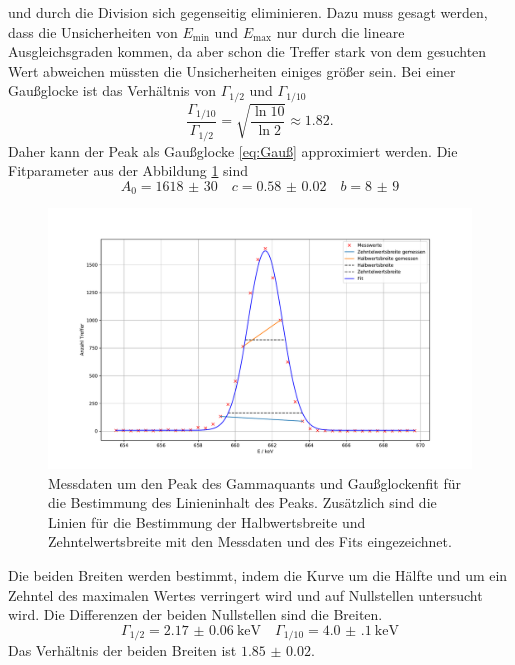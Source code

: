 und durch die Division sich gegenseitig eliminieren. Dazu muss gesagt werden, dass die Unsicherheiten von $E_{\text{min}}$ und
$E_{\text{max}}$ nur durch die lineare Ausgleichsgraden kommen, da aber schon die Treffer stark von dem gesuchten Wert abweichen müssten die 
Unsicherheiten einiges größer sein.
Bei einer Gaußglocke ist das Verhältnis von $\Gamma_{1/2}$ und $\Gamma_{1/10}$ 
\begin{equation*}
  \frac{\Gamma_{1/10}}{\Gamma_{1/2}}= \sqrt{\frac{\ln{10}}{\ln{2}}} \approx \num{1.82}.
\end{equation*}
Daher kann der Peak als Gaußglocke \eqref{eq:Gauß} approximiert werden. 
Die Fitparameter aus der Abbildung \ref{fig:02_fit} sind 
\begin{equation*}
  A_0 = \num{1618(30)}\quad c = \num{0.58(2)} \quad b = \num{8(9)}
\end{equation*}
\FloatBarrier
\begin{figure}
  \centering
  \caption{Messdaten um den Peak des Gammaquants und Gaußglockenfit für die Bestimmung des Linieninhalt des Peaks. Zusätzlich sind die 
  Linien für die Bestimmung der Halbwertsbreite und Zehntelwertsbreite mit den Messdaten und des Fits eingezeichnet.}
  \label{fig:02_fit}
  \includegraphics[width=\textwidth,keepaspectratio]{figure/02_peak_fit.pdf}
\end{figure}
\FloatBarrier
Die beiden Breiten werden bestimmt, indem die Kurve um die Hälfte und um ein Zehntel des maximalen Wertes verringert wird und auf Nullstellen 
untersucht wird.
Die Differenzen der beiden Nullstellen sind die Breiten.
\begin{equation*}
  \Gamma_{1/2} = \SI{2.17(6)}{\kilo\eV}\quad \Gamma_{1/10} = \SI{4.0(1)}{\kilo\eV}
\end{equation*}
Das Verhältnis der beiden Breiten ist $\num{1.85(2)}$. 
